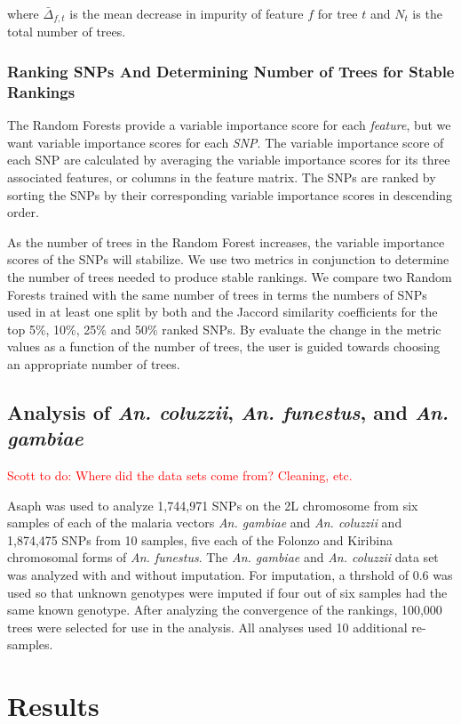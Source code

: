 where $\bar{\Delta}_{f, t}$ is the mean decrease in impurity of feature $f$ for tree $t$ and $N_t$ is the total number of trees.

\subsubsection{Ranking SNPs And Determining Number of Trees for Stable Rankings}
The Random Forests provide a variable importance score for each \emph{feature}, but we want variable importance scores for each \emph{SNP}. The variable importance score of each SNP are calculated by averaging the variable importance scores for its three associated features, or columns in the feature matrix.  The SNPs are ranked by sorting the SNPs by their corresponding variable importance scores in descending order.  

As the number of trees in the Random Forest increases, the variable importance scores of the SNPs will stabilize.  We use two metrics in conjunction to determine the number of trees needed to produce stable rankings. We compare two Random Forests trained with the same number of trees in terms the numbers of SNPs used in at least one split by both and the Jaccord similarity coefficients for the top 5\%, 10\%, 25\% and 50\% ranked SNPs.  By evaluate the change in the metric values as a function of the number of trees, the user is guided towards choosing an appropriate number of trees.

\subsection{Analysis of \emph{An. coluzzii}, \emph{An. funestus}, and \emph{An. gambiae}}
\textcolor{red}{Scott to do: Where did the data sets come from?  Cleaning, etc.}

Asaph was used to analyze 1,744,971 SNPs on the 2L chromosome from six samples of each of the malaria vectors \emph{An. gambiae} and \emph{An. coluzzii} and 1,874,475 SNPs from 10 samples, five each of the Folonzo and Kiribina chromosomal forms of \emph{An. funestus}. The \emph{An. gambiae} and \emph{An. coluzzii} data set was analyzed with and without imputation. For imputation, a thrshold of 0.6 was used so that unknown genotypes were imputed if four out of six samples had the same known genotype.  After analyzing the convergence of the rankings, 100,000 trees were selected for use in the analysis.  All analyses used 10 additional re-samples.

\section{Results}

